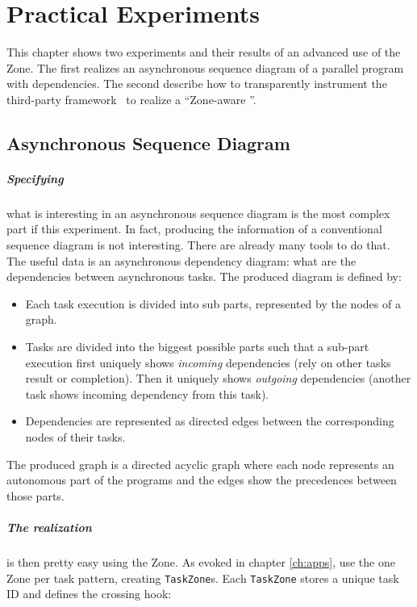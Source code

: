 
\chapter{Practical Experiments}
\label{ch:inpractice}

This chapter shows two experiments and their results of an advanced use of the Zone. The first realizes an asynchronous sequence diagram of a parallel program with dependencies. The second describe how to transparently instrument the third-party framework \vertx\ to realize a ``Zone-aware \vertx''.

\section{Asynchronous Sequence Diagram}


\paragraph{Specifying} what is interesting in an asynchronous sequence diagram is the most complex part if this experiment. In fact, producing the information of a conventional sequence diagram is not interesting. There are already many tools to do that. The useful data is an asynchronous dependency diagram: what are the dependencies between asynchronous tasks. The produced diagram is defined by:

\begin{itemize}
\item Each task execution is divided into sub parts, represented by the nodes of a graph.
\item Tasks are divided into the biggest possible parts such that a sub-part execution first uniquely shows \emph{incoming} dependencies (rely on other tasks result or completion). Then it uniquely shows \emph{outgoing} dependencies (another task shows incoming dependency from this task).
\item Dependencies are represented as directed edges between the corresponding nodes of their tasks.
\end{itemize}

The produced graph is a directed acyclic graph where each node represents an autonomous part of the programs and the edges show the precedences between those parts.

\paragraph{The realization} is then pretty easy using the Zone. As evoked in chapter \ref{ch:apps}, use the one Zone per task pattern, creating \lstinline{TaskZone}s. Each \lstinline{TaskZone} stores a unique task ID and defines the crossing hook: 

